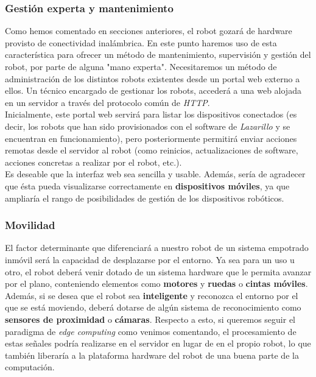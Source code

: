 \subsubsection{Gestión experta y mantenimiento}

Como hemos comentado en secciones anteriores, el robot gozará de hardware provisto de conectividad inalámbrica. En este punto haremos uso de esta característica para ofrecer un método de mantenimiento, supervisión y gestión del robot, por parte de alguna "mano experta". Necesitaremos un método de administración de los distintos robots existentes desde un portal web externo a ellos. Un técnico encargado de gestionar los robots, accederá a una web alojada en un servidor a través del protocolo común de \textit{HTTP}.\\

Inicialmente, este portal web servirá para listar los dispositivos conectados (es decir, los robots que han sido provisionados con el software de \textit{Lazarillo} y se encuentran en funcionamiento), pero posteriormente permitirá enviar acciones remotas desde el servidor al robot (como reinicios, actualizaciones de software, acciones concretas a realizar por el robot, etc.).\\

Es deseable que la interfaz web sea sencilla y usable. Además, sería de agradecer que ésta pueda visualizarse correctamente en \textbf{dispositivos móviles}, ya que ampliaría el rango de posibilidades de gestión de los dispositivos robóticos.\\

\subsubsection{Movilidad}

El factor determinante que diferenciará a nuestro robot de un sistema empotrado inmóvil será la capacidad de desplazarse por el entorno. Ya sea para un uso u otro, el robot deberá venir dotado de un sistema hardware que le permita avanzar por el plano, conteniendo elementos como \textbf{motores} y \textbf{ruedas} o \textbf{cintas móviles}.\\

Además, si se desea que el robot sea \textbf{inteligente} y reconozca el entorno por el que se está moviendo, deberá dotarse de algún sistema de reconocimiento como \textbf{sensores de proximidad} o \textbf{cámaras}. Respecto a esto, si queremos seguir el paradigma de \textit{edge computing} como venimos comentando, el procesamiento de estas señales podría realizarse en el servidor en lugar de en el propio robot, lo que también liberaría a la plataforma hardware del robot de una buena parte de la computación.\\

